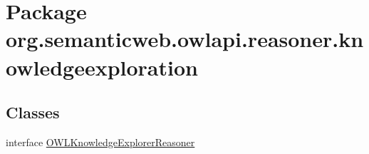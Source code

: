 \hypertarget{namespaceorg_1_1semanticweb_1_1owlapi_1_1reasoner_1_1knowledgeexploration}{\section{Package org.\-semanticweb.\-owlapi.\-reasoner.\-knowledgeexploration}
\label{namespaceorg_1_1semanticweb_1_1owlapi_1_1reasoner_1_1knowledgeexploration}
}
\subsection*{Classes}
\begin{DoxyCompactItemize}
\item 
interface \hyperlink{interfaceorg_1_1semanticweb_1_1owlapi_1_1reasoner_1_1knowledgeexploration_1_1_o_w_l_knowledge_explorer_reasoner}{O\-W\-L\-Knowledge\-Explorer\-Reasoner}
\end{DoxyCompactItemize}
